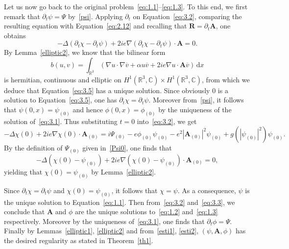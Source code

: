 \documentclass[AHL,Unicode,longabstracts]{cedram}
\newcommand{\BA}{\mathbf{A}}
\newcommand{\BR}{\mathbf{R}}
\newcommand{\R}{\mathbb{R}}
\newcommand{\Com}{\mathbb{C}}
\newcommand*{\dd}{\mathrm{d}}
\newcommand*{\dx}{\dd x}
\begin{document}
Let us now go back to the original problem~\eqref{eq:1.1}--\eqref{eq:1.3}. To this end, we first remark that $\partial_t \psi=\Psi$ by~\eqref{psi}. Applying $\partial_t$ on Equation~\eqref{eq:3.2}, comparing the resulting equation with Equation~\eqref{eq:2.12} and recalling that $\BR= \partial_t \BA$, one obtains
\begin{equation}\label{eq:3.5}
-\Delta (\partial_t \chi-\partial_t \psi) + 2ie \nabla(\partial_t \chi-\partial_t \psi)\cdot \BA=0.
\end{equation}
By Lemma~\ref{elliptic2}, we know that the bilinear form
\[
{b}(u,v) =\int_{\R^3} (\nabla u\cdot \nabla \overline{v}+\alpha u\overline{v}
+2ie \nabla u\cdot \BA \overline{v}) \,\dx
\]
is hermitian, continuous and elliptic on $H^1(\R^3,\Com) \times H^1(\R^3,\Com)$, from which we deduce that Equation~\eqref{eq:3.5} has a unique solution. Since obviously 0 is a solution to Equation~\eqref{eq:3.5}, one has $\partial_t \chi=\partial_t \psi$. Moreover from~\eqref{psi}, it follows that $\psi(0,x)=\psi_{(0)}$ and hence $\phi(0,x)=\phi_{(0)}$ by the uniqueness of the solution of~\eqref{eq:3.1}. Thus substituting $t=0$ into~\eqref{eq:3.2}, we get
\[
-\Delta \chi(0) +2ie \nabla \chi(0) \cdot \BA_{(0)} =i \Psi_{(0)}-e\phi_{(0)} \psi_{(0)} -e^2 | \BA_{(0)}|^2 \psi_{(0)}
+g(| \psi_{(0)}|^2)\psi_{(0)}.
\]
By the definition of $\Psi_{(0)}$ given in~\eqref{Psi0}, one finds that
\[
-\Delta (\chi(0)-\psi_{(0)})
+2ie \nabla (\chi(0)-\psi_{(0)}) \cdot \BA_{(0)} =0,
\]
yielding that $\chi(0)=\psi_{(0)}$ by Lemma~\ref{elliptic2}.

Since $\partial_t\chi =\partial_t \psi$ and $\chi(0)=\psi_{(0)}$, it follows that $\chi=\psi$. As a consequence, $\psi$ is the unique solution to Equation~\eqref{eq:1.1}. Then from~\eqref{eq:3.2} and~\eqref{eq:3.3}, we conclude that $\BA$ and $\phi$ are the unique solutions to~\eqref{eq:1.2} and~\eqref{eq:1.3} respectively. Moreover by the uniqueness of~\eqref{eq:3.1}, one finds that $\partial_t \phi = \Psi$. Finally by Lemmas~\ref{elliptic1}, \ref{elliptic2} and from~\eqref{esti1}, \eqref{esti2}, $(\psi, \BA, \phi)$ has the desired regularity as stated in Theorem~\ref{th1}.




\end{document}
